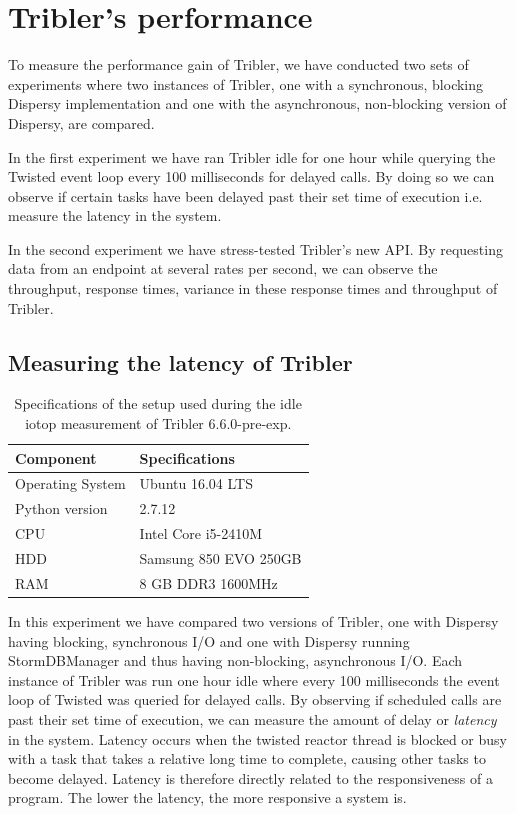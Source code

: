 \section{Tribler's performance}

To measure the performance gain of Tribler, we have conducted two sets of experiments where two instances of Tribler, one with a synchronous, blocking Dispersy implementation and one with the asynchronous, non-blocking version of Dispersy, are compared.

In the first experiment we have ran Tribler idle for one hour while querying the Twisted event loop every 100 milliseconds for delayed calls.
By doing so we can observe if certain tasks have been delayed past their set time of execution i.e. measure the latency in the system.

In the second experiment we have stress-tested Tribler's new API.
By requesting data from an endpoint at several rates per second, we can observe the throughput, response times, variance in these response times and throughput of Tribler.

\subsection{Measuring the latency of Tribler}

\begin{table}[h]
	\centering
	\begin{tabular}{l|l}
		\textbf{Component} 	& \textbf{Specifications} \\ \hline
		Operating System   	& Ubuntu 16.04 LTS \\
		Python version		& 2.7.12 \\
		CPU					& Intel Core i5-2410M \\ 
		HDD					& Samsung 850 EVO 250GB  \\ 
		RAM					& 8 GB DDR3 1600MHz \\
	\end{tabular}
	\caption{Specifications of the setup used during the idle iotop measurement of Tribler 6.6.0-pre-exp.}
	\label{table:tribler_idle}
\end{table}

In this experiment we have compared two versions of Tribler, one with Dispersy having  blocking, synchronous I/O and one with Dispersy running StormDBManager and thus having non-blocking, asynchronous I/O.
Each instance of Tribler was run one hour idle where every 100 milliseconds the event loop of Twisted was queried for delayed calls.
By observing if scheduled calls are past their set time of execution, we can measure the amount of delay or \emph{latency} in the system.
Latency occurs when the twisted reactor thread is blocked or busy with a task that takes a relative long time to complete, causing other tasks to become delayed.
Latency is therefore directly related to the responsiveness of a program.
The lower the latency, the more responsive a system is.

